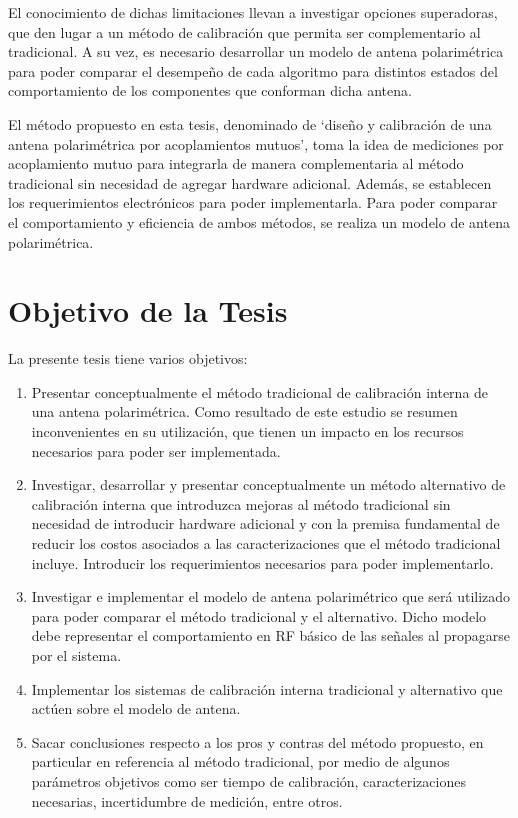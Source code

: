 El conocimiento de dichas limitaciones llevan a investigar opciones superadoras, que den lugar a un método de calibración que 
permita ser complementario al tradicional. A su vez, es necesario desarrollar un modelo de antena polarimétrica para poder 
comparar el desempeño de cada algoritmo para distintos estados del comportamiento de los componentes que conforman dicha antena.

El método propuesto en esta tesis, denominado de \enquote*{diseño y calibración de una antena polarimétrica por 
acoplamientos mutuos}, toma la idea de mediciones por acoplamiento mutuo \cite{Agrawal2003}\cite{Shipley2000} \cite{Aumann1989}
\cite{Chen2012} para integrarla de manera complementaria al método tradicional sin necesidad de agregar hardware adicional. 
Además, se establecen los requerimientos electrónicos para poder implementarla. Para poder comparar el comportamiento y 
eficiencia de ambos métodos, se realiza un modelo de antena polarimétrica.


\section{Objetivo de la Tesis} \label{sc:objective}

La presente tesis tiene varios objetivos:

\begin{enumerate}
    \item Presentar conceptualmente el método tradicional de calibración interna de una antena polarimétrica. Como resultado
		de este estudio se resumen inconvenientes en su utilización, que tienen un impacto en los recursos necesarios para poder ser
		implementada. 
    \item Investigar, desarrollar y presentar conceptualmente un método alternativo de calibración interna que introduzca
		mejoras al método tradicional sin necesidad de introducir hardware adicional y con la premisa fundamental de
		reducir los costos asociados a las caracterizaciones que el método tradicional incluye. Introducir los
		requerimientos necesarios para poder implementarlo.
    \item Investigar e implementar el modelo de antena polarimétrico que será utilizado para poder comparar el 
		método tradicional y el alternativo. Dicho modelo debe representar el comportamiento en RF básico de las señales al 
		propagarse por el sistema.
    \item Implementar los sistemas de calibración interna tradicional y alternativo que actúen sobre el modelo de antena. 
    \item Sacar conclusiones respecto a los pros y contras del método propuesto, en particular en referencia al método
		tradicional, por medio de algunos parámetros objetivos como ser tiempo de calibración, caracterizaciones necesarias,
		incertidumbre de medición, entre otros.
\end{enumerate}


